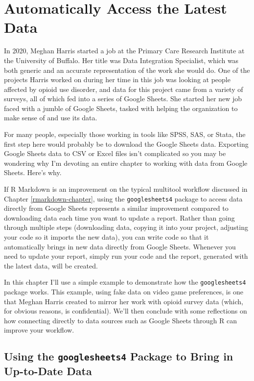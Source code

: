 \documentclass[
]{book}
\begin{document}
\hypertarget{googlesheets-chapter}{%
\chapter{Automatically Access the Latest Data}\label{googlesheets-chapter}}

In 2020, Meghan Harris started a job at the Primary Care Research Institute at the University of Buffalo. Her title was Data Integration Specialist, which was both generic and an accurate representation of the work she would do. One of the projects Harris worked on during her time in this job was looking at people affected by opioid use disorder, and data for this project came from a variety of surveys, all of which fed into a series of Google Sheets. She started her new job faced with a jumble of Google Sheets, tasked with helping the organization to make sense of and use its data.

For many people, especially those working in tools like SPSS, SAS, or Stata, the first step here would probably be to download the Google Sheets data. Exporting Google Sheets data to CSV or Excel files isn't complicated so you may be wondering why I'm devoting an entire chapter to working with data from Google Sheets. Here's why.

If R Markdown is an improvement on the typical multitool workflow discussed in Chapter \ref{rmarkdown-chapter}, using the \texttt{googlesheets4} package to access data directly from Google Sheets represents a similar improvement compared to downloading data each time you want to update a report. Rather than going through multiple steps (downloading data, copying it into your project, adjusting your code so it imports the new data), you can write code so that it automatically brings in new data directly from Google Sheets. Whenever you need to update your report, simply run your code and the report, generated with the latest data, will be created.

In this chapter I'll use a simple example to demonstrate how the \texttt{googlesheets4} package works. This example, using fake data on video game preferences, is one that Meghan Harris created to mirror her work with opioid survey data (which, for obvious reasons, is confidential). We'll then conclude with some reflections on how connecting directly to data sources such as Google Sheets through R can improve your workflow.

\hypertarget{using-the-googlesheets4-package-to-bring-in-up-to-date-data}{%
\section*{\texorpdfstring{Using the \texttt{googlesheets4} Package to Bring in Up-to-Date Data}{Using the googlesheets4 Package to Bring in Up-to-Date Data}}\label{using-the-googlesheets4-package-to-bring-in-up-to-date-data}}
\end{document}
